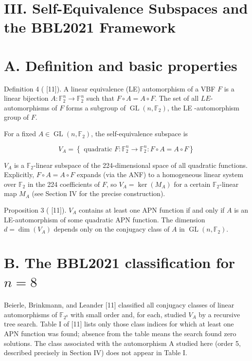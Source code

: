 \documentclass[10pt]{article}
\begin{document}
\section*{III. Self-Equivalence Subspaces and the BBL2021 Framework}
\section*{A. Definition and basic properties}
Definition 4 ( [11]). A linear equivalence (LE) automorphism of a VBF $F$ is a linear bijection $A: \mathbb{F}_{2}^{n} \rightarrow \mathbb{F}_{2}^{n}$ such that $F \circ A=A \circ F$. The set of all $L E$-automorphisms of $F$ forms a subgroup of $\operatorname{GL}\left(n, \mathbb{F}_{2}\right)$, the LE -automorphism group of $F$.

For a fixed $A \in \operatorname{GL}\left(n, \mathbb{F}_{2}\right)$, the self-equivalence subspace is

$$
V_{A}=\left\{\text { quadratic } F: \mathbb{F}_{2}^{n} \rightarrow \mathbb{F}_{2}^{n}: F \circ A=A \circ F\right\}
$$

$V_{A}$ is a $\mathbb{F}_{2}$-linear subspace of the 224-dimensional space of all quadratic functions. Explicitly, $F \circ A=A \circ F$ expands (via the ANF) to a homogeneous linear system over $\mathbb{F}_{2}$ in the 224 coefficients of $F$, so $V_{A}=\operatorname{ker}\left(M_{A}\right)$ for a certain $\mathbb{F}_{2}$-linear map $M_{A}$ (see Section IV for the precise construction).

Proposition 3 ( [11]). $V_{A}$ contains at least one APN function if and only if $A$ is an LE-automorphism of some quadratic APN function. The dimension $d=\operatorname{dim}\left(V_{A}\right)$ depends only on the conjugacy class of $A$ in $\operatorname{GL}\left(n, \mathbb{F}_{2}\right)$.

\section*{B. The BBL2021 classification for $n=8$}
Beierle, Brinkmann, and Leander [11] classified all conjugacy classes of linear automorphisms of $\mathbb{F}_{2^{8}}$ with small order and, for each, studied $V_{A}$ by a recursive tree search. Table I of [11] lists only those class indices for which at least one APN function was found; absence from the table means the search found zero solutions. The class associated with the automorphism A studied here (order 5, described precisely in Section IV) does not appear in Table I.
\end{document}
